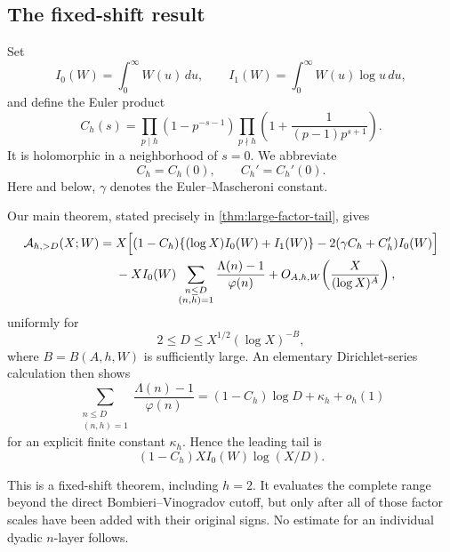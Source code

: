 \subsection{The fixed-shift result}

Set
\begin{equation}\label{eq:intro-moments-W}
 I_0(W)=\int_0^\infty W(u)\,du,
 \qquad
 I_1(W)=\int_0^\infty W(u)\log u\,du,
\end{equation}
and define the Euler product
\begin{equation}\label{eq:intro-Chs}
 C_h(s)=
 \prod_{p\mid h}(1-p^{-s-1})
 \prod_{p\nmid h}
 \left(1+\frac1{(p-1)p^{s+1}}\right).
\end{equation}
It is holomorphic in a neighborhood of $s=0$.  We abbreviate
\begin{equation}\label{eq:intro-Ch-notation}
 C_h=C_h(0),\qquad C_h'=C_h'(0).
\end{equation}
Here and below, $\gamma$ denotes the Euler--Mascheroni constant.

Our main theorem, stated precisely in \cref{thm:large-factor-tail}, gives
\begin{align}
 \mathcal A_{h,>D}(X;W)
={}&X\Big[(1-C_h)\{(\log X)I_0(W)+I_1(W)\}
       -2(\gamma C_h+C_h')I_0(W)\Big]
 \notag\\
 &-XI_0(W)
 \sum_{\substack{n\leq D\\(n,h)=1}}
 \frac{\Lambda(n)-1}{\varphi(n)}
 +O_{A,h,W}\!\left(\frac{X}{(\log X)^A}\right),
 \label{eq:intro-tail-formula}
\end{align}
uniformly for
\begin{equation}\label{eq:intro-D-range}
 2\leq D\leq X^{1/2}(\log X)^{-B},
\end{equation}
where $B=B(A,h,W)$ is sufficiently large.  An elementary Dirichlet-series
calculation then shows
\begin{equation}\label{eq:intro-coefficient-sum}
 \sum_{\substack{n\leq D\\(n,h)=1}}
 \frac{\Lambda(n)-1}{\varphi(n)}
 =(1-C_h)\log D+\kappa_h+o_h(1)
\end{equation}
for an explicit finite constant $\kappa_h$.  Hence the leading tail is
\begin{equation}\label{eq:intro-tail-leading}
 (1-C_h)XI_0(W)\log(X/D).
\end{equation}

This is a fixed-shift theorem, including $h=2$.  It evaluates the complete
range beyond the direct Bombieri--Vinogradov cutoff, but only after all of
those factor scales have been added with their original signs.  No estimate
for an individual dyadic $n$-layer follows.

